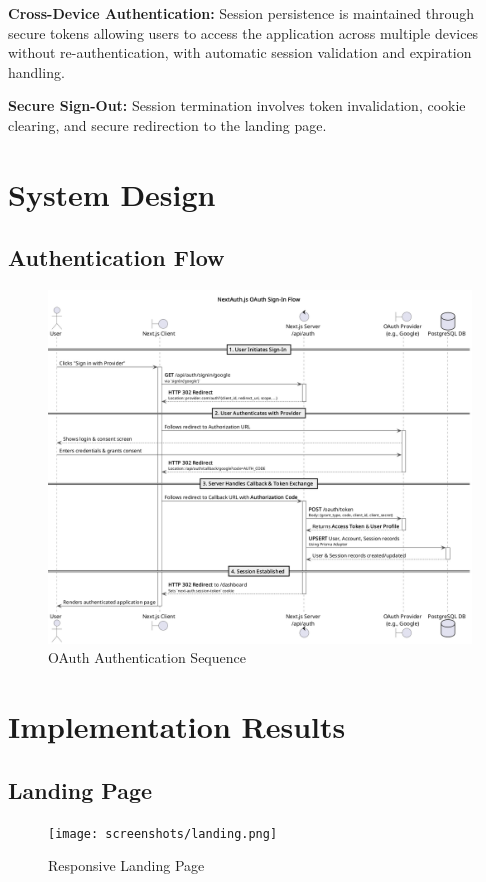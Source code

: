 \textbf{Cross-Device Authentication:}
Session persistence is maintained through secure tokens allowing users to access the application across multiple devices without re-authentication, with automatic session validation and expiration handling.

\textbf{Secure Sign-Out:}
Session termination involves token invalidation, cookie clearing, and secure redirection to the landing page.

\section{System Design}

\subsection{Authentication Flow}
\begin{figure}[H]
    \centering
    \includegraphics[width=1\textwidth]{conception/SprintII/sequence_diagrams/sequence_authentication_1_1_AuthenticateUsingGoogleAccount.png}
    \caption{OAuth Authentication Sequence}
    \label{fig:seq_google_auth}
\end{figure}


\section{Implementation Results}

\subsection{Landing Page}
\begin{figure}[H]
    \centering
    \texttt{[image: screenshots/landing.png]}
    \caption{Responsive Landing Page}
    \label{fig:landing_page}
\end{figure}

